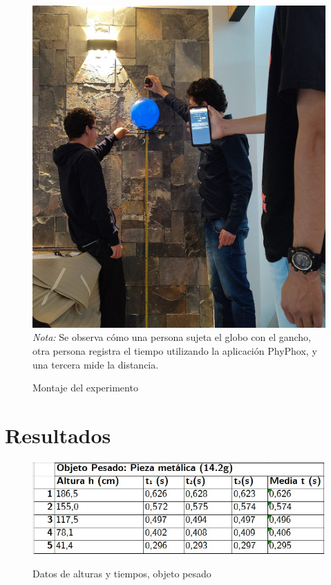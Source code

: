 \begin{multicols}{2}
\begin{figure}[H]
    \caption{Montaje del experimento}
    \centering
    \includegraphics[scale=0.1]{fig/montaje.png}
    \label{fig:montaje}\\
    \textit{Nota: }Se observa cómo una persona sujeta el globo con el gancho, 
    otra persona registra el tiempo utilizando la aplicación PhyPhox, y una tercera mide la distancia.
\end{figure}



\section*{Resultados}
\begin{figure}[H]
    \caption{Datos de alturas y tiempos, objeto pesado}
    \centering
    \includegraphics[scale=0.3]{fig/Tabla1-ObjetoPesado.png}
    \label{fig:tabla1}
\end{figure}


\end{multicols}
